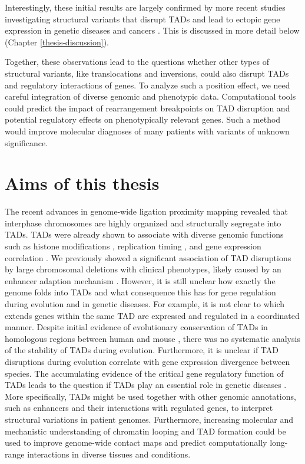 \documentclass[a4paper,twoside=true,openright,parskip=full,chapterprefix=true,11pt,headings=normal,bibliography=totoc,listof=totoc,titlepage=on,captions=tableabove,draft=false]{scrreprt}
\theoremstyle{definition}
\theoremstyle{definition}
\theoremstyle{definition}
\theoremstyle{remark}
\begin{document}
Interestingly, these initial results are largely confirmed by more
recent studies investigating structural variants that disrupt TADs and
lead to ectopic gene expression in genetic diseases
\citep{Lupianez2015, Franke2016, Redin2017} and cancers
\citep{Northcott2014, Hnisz2016, Weischenfeldt2016}. This is discussed
in more detail below (Chapter \ref{thesis-discussion}).

Together, these observations lead to the questions whether other types
of structural variants, like translocations and inversions, could also
disrupt TADs and regulatory interactions of genes. To analyze such a
position effect, we need careful integration of diverse genomic and
phenotypic data. Computational tools could predict the impact of
rearrangement breakpoints on TAD disruption and potential regulatory
effects on phenotypically relevant genes. Such a method would improve
molecular diagnoses of many patients with variants of unknown
significance.

\hypertarget{aims-of-this-thesis}{%
\section{Aims of this thesis}\label{aims-of-this-thesis}}

The recent advances in genome-wide ligation proximity mapping revealed
that interphase chromosomes are highly organized and structurally
segregate into TADs. TADs were already shown to associate with diverse
genomic functions such as histone modifications
\citep{Dixon2012, Sexton2012}, replication timing \citep{Pope2014}, and
gene expression correlation \citep{Nora2012, LeDily2014}. We previously
showed a significant association of TAD disruptions by large chromosomal
deletions with clinical phenotypes, likely caused by an enhancer
adaption mechanism \citep{Ibn-Salem2014}. However, it is still unclear
how exactly the genome folds into TADs and what consequence this has for
gene regulation during evolution and in genetic diseases. For example,
it is not clear to which extends genes within the same TAD are expressed
and regulated in a coordinated manner. Despite initial evidence of
evolutionary conservation of TADs in homologous regions between human
and mouse \citep{Dixon2012, VietriRudan2015}, there was no systematic
analysis of the stability of TADs during evolution. Furthermore, it is
unclear if TAD disruptions during evolution correlate with gene
expression divergence between species. The accumulating evidence of the
critical gene regulatory function of TADs leads to the question if TADs
play an essential role in genetic diseases \citep{Spielmann2016}. More
specifically, TADs might be used together with other genomic
annotations, such as enhancers and their interactions with regulated
genes, to interpret structural variations in patient genomes.
Furthermore, increasing molecular and mechanistic understanding of
chromatin looping and TAD formation could be used to improve genome-wide
contact maps and predict computationally long-range interactions in
diverse tissues and conditions.
\end{document}
